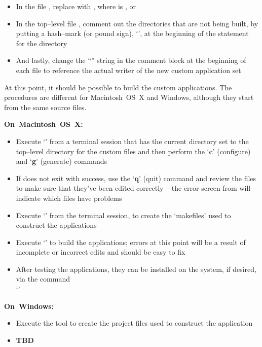 \begin{itemize}
\item In the file , replace
 with ,
where  is ,  or 
\item In the top--level file , comment out the directories that are
not being built, by putting a hash--mark (or pound sign), `\asCode{\#}', at the beginning
of the  statement for the directory
\item And lastly, change the ``'' string in the comment block at the
beginning of each file to reference the actual writer of the new custom application set
\end{itemize}
\tertiaryEnd{}
At this point, it should be possible to build the custom applications.
The procedures are different for Macintosh~OS~X and Windows, although they start from the
same source files. 
\begin{center}\textbf{On~Macintosh~OS~X:}\end{center}
\begin{itemize}
\item Execute `' from a terminal session that has the current directory
set to the top--level directory for the custom files and then perform the `\textbf{c}'
(configure) and `\textbf{g}' (generate) commands
\item If  does not exit with success, use the `\textbf{q}' (quit) command
and review the  files to make sure that they've been edited
correctly -- the error screen from  will indicate which files have problems
\item Execute `' from the terminal session, to create the `makefiles' used
to construct the applications
\item Execute `' to build the applications; errors at this
point will be a result of incomplete or incorrect edits and should be easy to fix
\item After testing the applications, they can be installed on the system, if desired, via
the command\\
`'
\end{itemize}
\begin{center}\textbf{On~Windows:}\end{center}
\begin{itemize}
\item Execute the tool  to create the project files used to construct the
application
\item \textbf{TBD}
\end{itemize}
